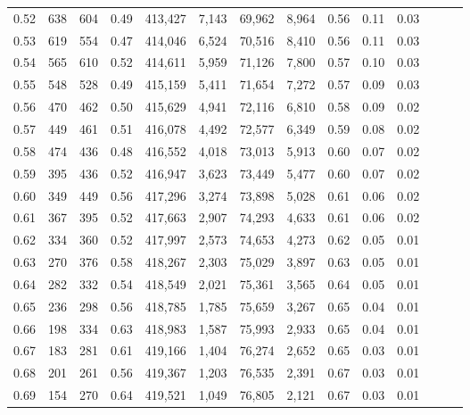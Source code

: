 \begin{tabular}{rrrrrrrrrrrrrr}
0.52 &     638 &    604 &  0.49 &  413,427 &    7,143 &  69,962 &   8,964 &  0.56 &  0.11 &      0.03 \\
0.53 &     619 &    554 &  0.47 &  414,046 &    6,524 &  70,516 &   8,410 &  0.56 &  0.11 &      0.03 \\
0.54 &     565 &    610 &  0.52 &  414,611 &    5,959 &  71,126 &   7,800 &  0.57 &  0.10 &      0.03 \\
0.55 &     548 &    528 &  0.49 &  415,159 &    5,411 &  71,654 &   7,272 &  0.57 &  0.09 &      0.03 \\
0.56 &     470 &    462 &  0.50 &  415,629 &    4,941 &  72,116 &   6,810 &  0.58 &  0.09 &      0.02 \\
0.57 &     449 &    461 &  0.51 &  416,078 &    4,492 &  72,577 &   6,349 &  0.59 &  0.08 &      0.02 \\
0.58 &     474 &    436 &  0.48 &  416,552 &    4,018 &  73,013 &   5,913 &  0.60 &  0.07 &      0.02 \\
0.59 &     395 &    436 &  0.52 &  416,947 &    3,623 &  73,449 &   5,477 &  0.60 &  0.07 &      0.02 \\
0.60 &     349 &    449 &  0.56 &  417,296 &    3,274 &  73,898 &   5,028 &  0.61 &  0.06 &      0.02 \\
0.61 &     367 &    395 &  0.52 &  417,663 &    2,907 &  74,293 &   4,633 &  0.61 &  0.06 &      0.02 \\
0.62 &     334 &    360 &  0.52 &  417,997 &    2,573 &  74,653 &   4,273 &  0.62 &  0.05 &      0.01 \\
0.63 &     270 &    376 &  0.58 &  418,267 &    2,303 &  75,029 &   3,897 &  0.63 &  0.05 &      0.01 \\
0.64 &     282 &    332 &  0.54 &  418,549 &    2,021 &  75,361 &   3,565 &  0.64 &  0.05 &      0.01 \\
0.65 &     236 &    298 &  0.56 &  418,785 &    1,785 &  75,659 &   3,267 &  0.65 &  0.04 &      0.01 \\
0.66 &     198 &    334 &  0.63 &  418,983 &    1,587 &  75,993 &   2,933 &  0.65 &  0.04 &      0.01 \\
0.67 &     183 &    281 &  0.61 &  419,166 &    1,404 &  76,274 &   2,652 &  0.65 &  0.03 &      0.01 \\
0.68 &     201 &    261 &  0.56 &  419,367 &    1,203 &  76,535 &   2,391 &  0.67 &  0.03 &      0.01 \\
0.69 &     154 &    270 &  0.64 &  419,521 &    1,049 &  76,805 &   2,121 &  0.67 &  0.03 &      0.01 \\

\end{tabular}
